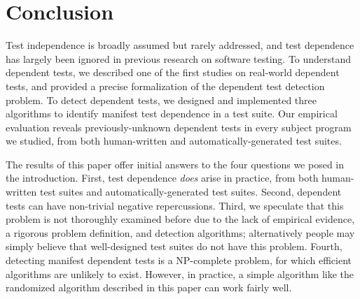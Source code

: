\section{Conclusion}
\label{sec:questions}

Test independence is broadly assumed but rarely addressed, and
test dependence has largely been ignored in previous
research on software testing. To understand
dependent tests, we described one of the first studies on
real-world dependent tests, and
provided a precise formalization of the dependent test detection
problem. To detect dependent tests, we designed
and implemented three algorithms to identify manifest test dependence
in a test suite. Our empirical evaluation reveals
previously-unknown dependent tests in every subject program
we studied, from both human-written and automatically-generated test
suites.

The results of this paper offer initial answers to the four questions we posed
in the introduction. First, test dependence \textit{does}
arise in practice, from both human-written test suites and automatically-generated
test suites. Second, dependent tests can have
non-trivial negative repercussions. Third, we speculate that this
problem is not thoroughly examined before due to the
lack of empirical evidence, a rigorous problem definition,
and detection algorithms; alternatively people may simply believe that well-designed
test suites do not have this problem.
Fourth,
detecting manifest dependent tests is a NP-complete problem,
for which efficient algorithms are unlikely to exist. However,
in practice, a simple algorithm like the randomized algorithm
described in this paper can work fairly well.

